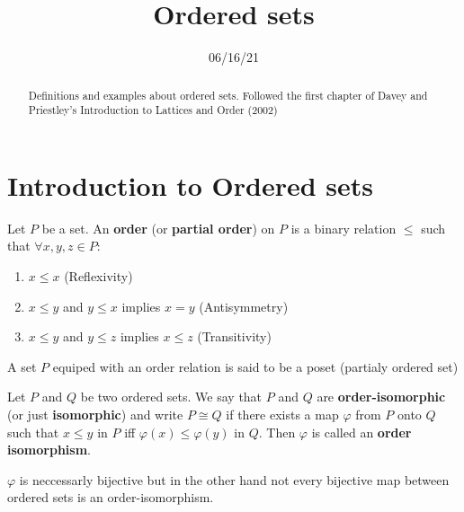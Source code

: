 

\title{\Large Ordered sets}
\date{06/16/21}



\maketitle

\begin{abstract}
  Definitions and examples about ordered sets. Followed the first chapter of
  Davey and Priestley's Introduction to Lattices and Order (2002)
\end{abstract}

\docrule


\section{Introduction to Ordered sets}

\begin{definition}
	Let $P$ be a set. An \textbf{order} (or \textbf{partial order}) on $P$ is a binary relation $\leq$ such that $\forall x,y,z \in P$:
	\begin{enumerate}
		\item $x \leq x$ (Reflexivity)
		\item $x \leq y$ and $y \leq x$ implies $x=y$ (Antisymmetry)
		\item $x \leq y$ and $y \leq z$ implies $x \leq z$ (Transitivity)
	\end{enumerate}
\end{definition}

\begin{remark}
	A set $P$ equiped with an order relation is said to be a poset (partialy ordered set)
\end{remark}

\begin{definition}\label{def:order-isomorphism}
	Let $P$ and $Q$ be two ordered sets. We say that $P$ and $Q$ are \textbf{order-isomorphic} (or just \textbf{isomorphic}) and write $P \cong Q$ if there exists a map $\varphi$ from $P$ onto $Q$ such that $x \leq y$ in $P$ iff $\varphi(x) \leq \varphi(y)$ in $Q$. Then $\varphi$ is called an \textbf{order isomorphism}.
\end{definition}

\begin{remark}
	$\varphi$ is neccessarly bijective but in the other hand not every bijective map between ordered sets is an order-isomorphism.
\end{remark}

